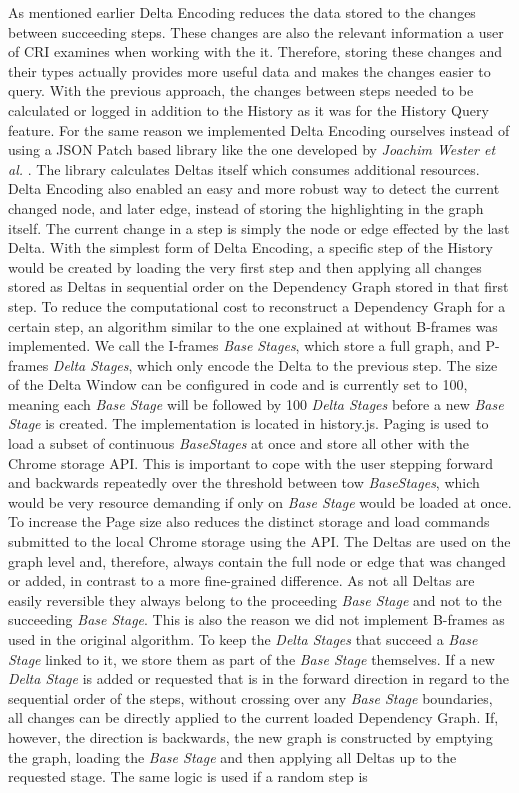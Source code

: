 As mentioned earlier Delta Encoding reduces the data stored to the changes between succeeding steps. These changes are also the relevant information a user of CRI examines when working with the it. Therefore, storing these changes and their types actually provides more useful data and makes the changes easier to query. With the previous approach, the changes between steps needed to be calculated or logged in addition to the History as it was for the History Query feature. For the same reason we implemented Delta Encoding ourselves instead of using a JSON Patch \cite{JSONPatch} based library like the one developed by \emph{Joachim Wester et al.} \cite{JSONPatchImplementation}. The library calculates Deltas itself which consumes additional resources. Delta Encoding also enabled an easy and more robust way to detect the current changed node, and later edge, instead of storing the highlighting in the graph itself. The current change in a step is simply the node or edge effected by the last Delta. With the simplest form of Delta Encoding, a specific step of the History would be created by loading the very first step and then applying all changes stored as Deltas in sequential order on the Dependency Graph stored in that first step. To reduce the computational cost to reconstruct a Dependency Graph for a certain step, an algorithm similar to the one explained at \cite{VideoEncoding} without B-frames was implemented. We call the I-frames \emph{Base Stages}, which store a full graph, and P-frames \emph{Delta Stages}, which only encode the Delta to the previous step. The size of the Delta Window can be configured in code and is currently set to 100, meaning each \emph{Base Stage} will be followed by 100 \emph{Delta Stages} before a new \emph{Base Stage} is created. The implementation is located in history.js. Paging is used to load a subset of continuous \emph{BaseStages} at once and store all other with the Chrome storage API. This is important to cope with the user stepping forward and backwards repeatedly over the threshold between tow \emph{BaseStages}, which would be very resource demanding if only on \emph{Base Stage} would be loaded at once. To increase the Page size also reduces the distinct storage and load commands submitted to the local Chrome storage using the API. The Deltas are used on the graph level and, therefore, always contain the full node or edge that was changed or added, in contrast to a more fine-grained difference. As not all Deltas are easily reversible they always belong to the proceeding \emph{Base Stage} and not to the succeeding \emph{Base Stage}. This is also the reason we did not implement B-frames as used in the original algorithm. To keep the \emph{Delta Stages} that succeed a \emph{Base Stage} linked to it, we store them as part of the \emph{Base Stage} themselves. If a new \emph{Delta Stage} is added or requested that is in the forward direction in regard to the sequential order of the steps, without crossing over any \emph{Base Stage} boundaries, all changes can be directly applied to the current loaded Dependency Graph. If, however, the direction is backwards, the new graph is constructed by emptying the graph, loading the \emph{Base Stage} and then applying all Deltas up to the requested stage. The same logic is used if a random step is 